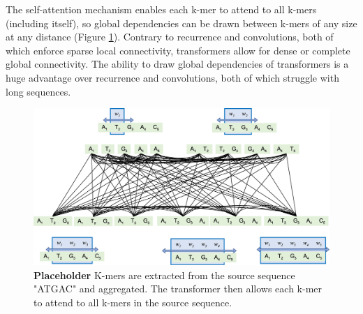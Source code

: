 \documentclass{article}
\begin{document}
The self-attention mechanism enables each k-mer to attend to all k-mers (including itself), so global dependencies can be drawn between k-mers of any size at any distance (Figure \ref{fig:global}). Contrary to recurrence and convolutions, both of which enforce sparse local connectivity, transformers allow for dense or complete global connectivity. The ability to draw global dependencies of transformers is a huge advantage over recurrence and convolutions, both of which struggle with long sequences. 


\begin{figure}[H]
\center
\includegraphics[width=1\textwidth]{k_mer_aggregation.eps}
%
\caption{\textbf{Placeholder} K-mers are extracted from the source sequence "ATGAC" and aggregated. The transformer then allows each k-mer to attend to all k-mers in the source sequence.}
\label{fig:global}
\end{figure}


\end{document}
